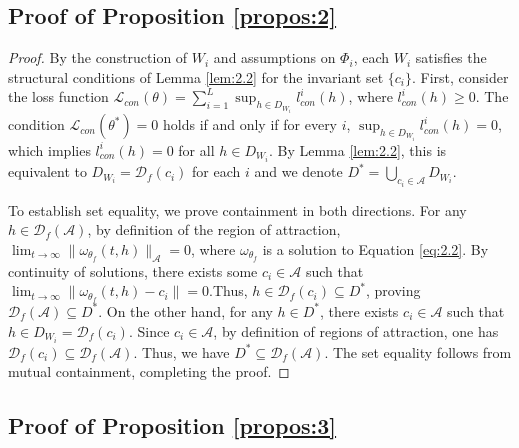 \documentclass[journal]{IEEEtran}
\begin{document}
{\subsection{Proof of Proposition \ref{propos:2}}
\label{app:pro3}

\begin{proof}
	 By the construction of $W_i$ and assumptions on $\Phi_i$, each $W_i$ satisfies the structural conditions of Lemma \ref{lem:2.2} for the invariant set $\{c_i\}$. First, consider the loss function $	\mathcal{L}_{con}(\theta) = \sum_{i=1}^L \sup_{h \in D_{W_i}} l_{con}^i(h)$, where $l_{con}^i(h) \geq 0$. The condition $\mathcal{L}_{con}(\theta^*) = 0$ holds if and only if for every $i$, $\sup_{h \in D_{W_i}} l_{con}^i(h) = 0$, which implies $l_{con}^i(h) = 0$ for all $h \in D_{W_i}$. By Lemma \ref{lem:2.2}, this is equivalent to $D_{W_i} = \mathcal{D}_{f}(c_i)$ for each $i$ and we denote $D^* = \bigcup_{c_i \in \mathcal{A}} D_{W_i}$. 
	
	To establish set equality, we prove containment in both directions.  For any $h \in \mathcal{D}_{f}(\mathcal{A})$, by definition of the region of attraction, $\lim_{t \to \infty} \| \omega_{\theta_f}(t, h) \|_{\mathcal{A}} = 0$, where $\omega_{\theta_f}$ is a solution to Equation \eqref{eq:2.2}. By continuity of solutions, there exists some $c_i \in \mathcal{A}$ such that $\lim_{t \to \infty} \| \omega_{\theta_f}(t, h) - c_i \| = 0$.Thus, $h \in \mathcal{D}_{f}(c_i) \subseteq D^*$, proving $\mathcal{D}_{f}(\mathcal{A}) \subseteq D^*$. On the other hand, for any $h \in D^*$, there exists $c_i \in \mathcal{A}$ such that $h \in D_{W_i} = \mathcal{D}_f(c_i)$. Since $c_i \in \mathcal{A}$, by definition of regions of attraction, one has $\mathcal{D}_{f}(c_i) \subseteq \mathcal{D}_{f}(\mathcal{A})$. Thus, we have $D^* \subseteq \mathcal{D}_{f}(\mathcal{A})$. The set equality follows from mutual containment, completing the proof.
\end{proof}

\subsection{Proof of Proposition \ref{propos:3}}
\label{app:pro4}

}
\end{document}
